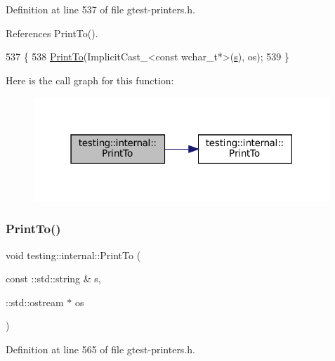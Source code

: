 Definition at line 537 of file gtest-\/printers.\+h.



References Print\+To().


\begin{DoxyCode}
537                                                 \{
538   \hyperlink{namespacetesting_1_1internal_af2c33928facbf2edf7af564278724d98}{PrintTo}(ImplicitCast\_<const wchar\_t*>(\hyperlink{namespaceservice__node__3_aa976421a49e0b54f23833423400849ae}{s}), os);
539 \}
\end{DoxyCode}
Here is the call graph for this function\+:
\nopagebreak
\begin{figure}[H]
\begin{center}
\leavevmode
\includegraphics[width=316pt]{namespacetesting_1_1internal_a8d41baa371fad3eb5a3dbe1bbc02c290_cgraph}
\end{center}
\end{figure}
\mbox{\label{namespacetesting_1_1internal_af59b4f5d83276cd807c45063b14bad44}} 
\subsubsection{\texorpdfstring{Print\+To()}{PrintTo()}\hspace{0.1cm}{\footnotesize\ttfamily [18/20]}}
{\footnotesize\ttfamily void testing\+::internal\+::\+Print\+To (\begin{DoxyParamCaption}\item[{const \+::std\+::string \&}]{s,  }\item[{\+::std\+::ostream $\ast$}]{os }\end{DoxyParamCaption})\hspace{0.3cm}{\ttfamily [inline]}}



Definition at line 565 of file gtest-\/printers.\+h.




